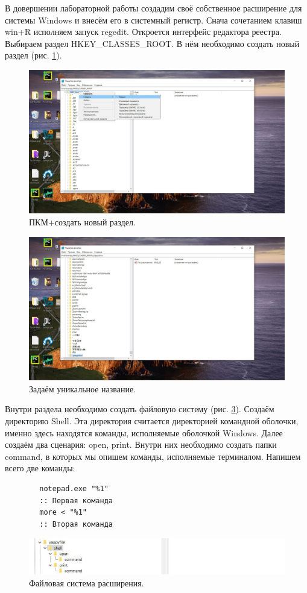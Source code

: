 В довершении лабораторной работы создадим своё собственное расширение для системы Windows и внесём его в системный регистр. Снача сочетанием клавиш win+R исполняем запуск regedit. Откроется интерфейс редактора реестра. Выбираем раздел HKEY\_CLASSES\_ROOT. В нём необходимо создать новый раздел (рис. \ref{fig:new_r}).

\begin{figure}[h!]
    \centering
    \includegraphics[width=0.5\linewidth]{Pic/lab2/photo_2025-05-22_00-26-11.jpg}
    \caption{ПКМ+создать новый раздел.}
    \label{fig:new_r}
\end{figure}

\begin{figure}[h!]
    \centering
    \includegraphics[width=0.5\linewidth]{Pic/lab2/photo_2025-05-22_00-26-13.jpg}
    \caption{Задаём уникальное название.}
    \label{fig:NewRComplete}
\end{figure}

Внутри раздела необходимо создать файловую систему (рис. \ref{fig:extenddir}). Создаём директорию Shell. Эта директория считается директорией командной оболочки, именно здесь находятся команды, исполняемые оболочкой Windows. Далее создаём два сценария: open, print. Внутри них необходимо создать папки command, в которых мы опишем команды, исполняемые терминалом. Напишем всего две команды: 
\begin{verbatim}
        notepad.exe "%1"
        :: Первая команда
        more < "%1"
        :: Вторая команда
\end{verbatim}

\begin{figure}[h!]
    \centering
    \includegraphics[width=\linewidth]{Pic/lab2/photo_2025-05-22_00-26-14.jpg}
    \caption{Файловая система расширения.}
    \label{fig:extenddir}
\end{figure}

